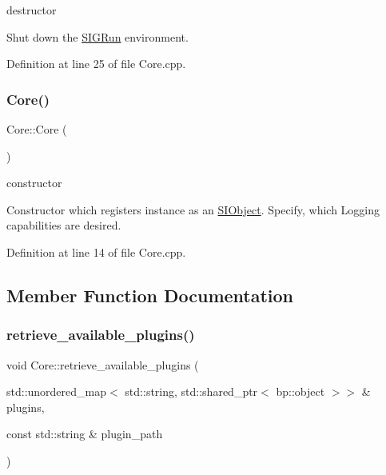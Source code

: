 destructor 

Shut down the \mbox{\hyperlink{class_s_i_g_run}{S\+I\+G\+Run}} environment. 

Definition at line 25 of file Core.\+cpp.

\mbox{\label{class_core_a14e63188e0aa7c4a6f72d5501384d1f9}} 
\subsubsection{\texorpdfstring{Core()}{Core()}}
{\footnotesize\ttfamily Core\+::\+Core (\begin{DoxyParamCaption}{ }\end{DoxyParamCaption})\hspace{0.3cm}{\ttfamily [protected]}}



constructor 

Constructor which registers instance as an \mbox{\hyperlink{class_s_i_object}{S\+I\+Object}}. Specify, which Logging capabilities are desired. 

Definition at line 14 of file Core.\+cpp.



\subsection{Member Function Documentation}
\mbox{\label{class_core_a3a6a2f7dac4b218a4c7e165c1999197f}} 
\subsubsection{\texorpdfstring{retrieve\_available\_plugins()}{retrieve\_available\_plugins()}}
{\footnotesize\ttfamily void Core\+::retrieve\+\_\+available\+\_\+plugins (\begin{DoxyParamCaption}\item[{std\+::unordered\+\_\+map$<$ std\+::string, std\+::shared\+\_\+ptr$<$ bp\+::object $>$$>$ \&}]{plugins,  }\item[{const std\+::string \&}]{plugin\+\_\+path }\end{DoxyParamCaption})\hspace{0.3cm}{\ttfamily [protected]}}



